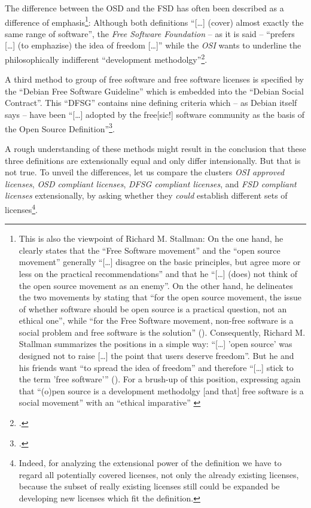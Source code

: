 The difference between the OSD and the FSD has often been described as a
difference of emphasis\footnote{This is also the viewpoint of Richard M.
Stallman: On the one hand, he clearly states that the \enquote{Free Software
movement} and the \enquote{open source movement} generally \enquote{[\ldots]
disagree on the basic principles, but agree more or less on the practical
recommendations} and that he \enquote{[\ldots] (does) not think of the open
source movement as an enemy}.  On the other hand, he delineates the two
movements by stating that \enquote{for the open source movement, the issue of
whether software should be open source is a practical question, not an ethical
one}, while \enquote{for the Free Software movement, non-free software is a
social problem and free software is the solution}
(\cite[cf.][55]{Stallman1998a}). \label{RmsFsPriority} Consequently, Richard
M. Stallman summarizes the positions in a simple way: \enquote{[\ldots] 'open
source' was designed not to raise [\ldots] the point that users deserve
freedom}. But he and his friends want \enquote{to spread the idea of freedom}
and therefore \enquote{[\ldots] stick to the term 'free software'}
(\cite[][59]{Stallman1998a}). For a brush-up of this position, expressing
again that \enquote{(o)pen source is a development methodolgy [and that] free
software is a social movement} with an \enquote{ethical imparative}
\cite[cf.][31]{Stallman2009a} }: Although both definitions \enquote{[\ldots]
(cover) almost exactly the same range of software}, the \emph{Free Software
Foundation} -- as it is said -- \enquote{prefers [\ldots] (to emphazise) the
idea of freedom [\ldots]} while the \emph{OSI} wants to underline the
philosophically indifferent \enquote{development methodolgy}\footcite[pars pro
toto: cf.][232]{Fogel2006a}.

A third method to group of free software and free software licenses is specified
by the \enquote{Debian Free Software Guideline} which is embedded into the
\enquote{Debian Social Contract}. This \enquote{DFSG} contains nine defining
criteria which -- as Debian itself says -- have been \enquote{[\ldots] adopted
by the free[sic!] software community as the basis of the Open Source
Definition}\footcite[cf.][wp]{DFSG2013a}.

A rough understanding of these methods might result in the conclusion that these
three definitions are extensionally equal and only differ intensionally.
But that is not true. To unveil the differences, let us compare the clusters
\emph{OSI approved licenses}, \emph{OSD compliant licenses}, \emph{DFSG
compliant licenses}, and \emph{FSD compliant licenses} extensionally, by asking
whether they \emph{could} establish different sets of licenses\footnote{Indeed,
for analyzing the extensional power of the definition we have to regard all
potentially covered licenses, not only the already existing licenses, because
the subset of really existing licenses still could be expanded be developing new
licenses which fit the definition.}.

